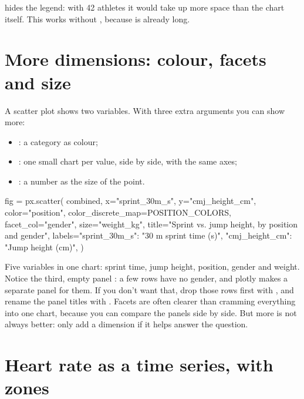 \documentclass[11pt,a4paper]{article}
\begin{document}
 hides the legend: with 42
athletes it would take up more space than the chart itself. This works
without , because  is already long.

\section{More dimensions: colour, facets and size}

A scatter plot shows two variables. With three extra arguments you can
show more:

\begin{itemize}
  \item {}: a category as colour;
  \item {}: one small chart per value, side by
        side, with the same axes;
  \item {}: a number as the size of the point.
\end{itemize}

\begin{python}[fig=facet]
fig = px.scatter(
    combined, x="sprint_30m_s", y="cmj_height_cm",
    color="position", color_discrete_map=POSITION_COLORS,
    facet_col="gender", size="weight_kg",
    title="Sprint vs. jump height, by position and gender",
    labels={"sprint_30m_s": "30 m sprint time (s)", "cmj_height_cm": "Jump height (cm)"},
)
\end{python}

Five variables in one chart: sprint time, jump height, position, gender
and weight. Notice the third, empty panel : a few rows
have no gender, and plotly makes a separate panel for them. If you don't
want that, drop those rows first with
, and rename the panel titles
with . Facets are often clearer than
cramming everything into one chart, because you can compare the panels
side by side. But more is not always better: only add a dimension if it
helps answer the question.

\section{Heart rate as a time series, with zones}
\end{document}
